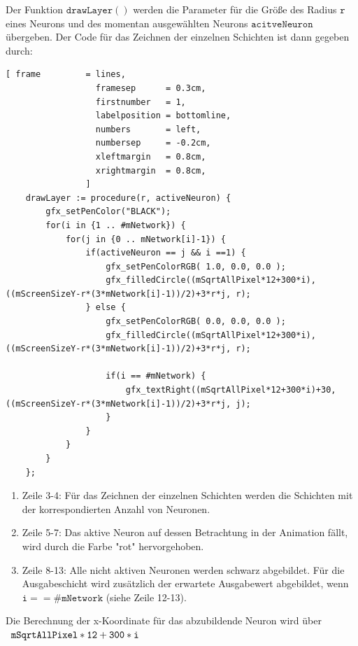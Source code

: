 \noindent
Der Funktion $\mathtt{drawLayer()}$ werden die Parameter für die Größe des Radius $\mathtt{r}$ eines Neurons und des momentan ausgewählten Neurons $\mathtt{acitveNeuron}$ übergeben. Der Code für das Zeichnen der einzelnen Schichten ist dann gegeben durch:
\begin{Verbatim}[ frame         = lines, 
                  framesep      = 0.3cm, 
                  firstnumber   = 1,
                  labelposition = bottomline,
                  numbers       = left,
                  numbersep     = -0.2cm,
                  xleftmargin   = 0.8cm,
                  xrightmargin  = 0.8cm,
                ]
    drawLayer := procedure(r, activeNeuron) {
        gfx_setPenColor("BLACK");
        for(i in {1 .. #mNetwork}) {	
            for(j in {0 .. mNetwork[i]-1}) {
                if(activeNeuron == j && i ==1) {
                    gfx_setPenColorRGB( 1.0, 0.0, 0.0 );				
                    gfx_filledCircle((mSqrtAllPixel*12+300*i), ((mScreenSizeY-r*(3*mNetwork[i]-1))/2)+3*r*j, r);
                } else {
                    gfx_setPenColorRGB( 0.0, 0.0, 0.0 );
                    gfx_filledCircle((mSqrtAllPixel*12+300*i), ((mScreenSizeY-r*(3*mNetwork[i]-1))/2)+3*r*j, r);
				
                    if(i == #mNetwork) {			
                        gfx_textRight((mSqrtAllPixel*12+300*i)+30, ((mScreenSizeY-r*(3*mNetwork[i]-1))/2)+3*r*j, j);
                    }
                }
            }		
        }
    };
\end{Verbatim}
\begin{enumerate}
	\item Zeile 3-4: Für das Zeichnen der einzelnen Schichten werden die Schichten mit der korrespondierten Anzahl von Neuronen.
	\item Zeile 5-7: Das aktive Neuron auf dessen Betrachtung in der Animation fällt, wird durch die Farbe "rot" hervorgehoben.   
	\item Zeile 8-13: Alle nicht aktiven Neuronen werden schwarz abgebildet. Für die Ausgabeschicht wird zusätzlich der erwartete Ausgabewert abgebildet, wenn $\mathtt{i == \#mNetwork}$ (siehe Zeile 12-13).
\end{enumerate}
Die Berechnung der x-Koordinate für das abzubildende Neuron wird über \\[0.2cm]
\hspace*{1.3cm}
$
\begin{array}[t]{lclll}
	\mathtt{mSqrtAllPixel*12+300*i}
\end{array}
$ 
\\[0.2cm]
